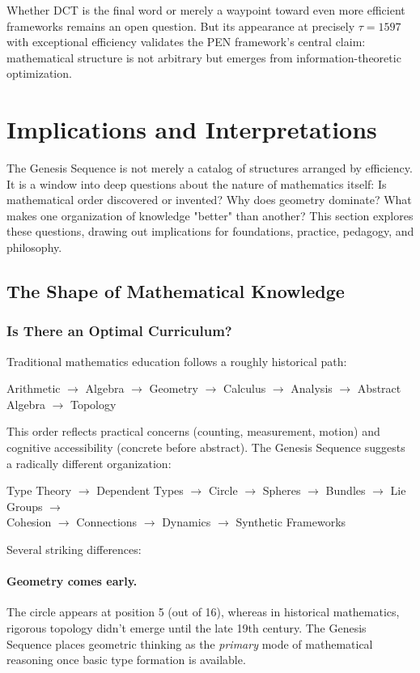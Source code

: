 \documentclass[11pt]{article}
\theoremstyle{definition}
\begin{document}
Whether DCT is the final word or merely a waypoint toward even more efficient frameworks remains an open question. But its appearance at precisely $\tau=1597$ with exceptional efficiency validates the PEN framework's central claim: mathematical structure is not arbitrary but emerges from information-theoretic optimization.

\section{Implications and Interpretations}
\label{sec:implications}

The Genesis Sequence is not merely a catalog of structures arranged by efficiency. It is a window into deep questions about the nature of mathematics itself: Is mathematical order discovered or invented? Why does geometry dominate? What makes one organization of knowledge "better" than another? This section explores these questions, drawing out implications for foundations, practice, pedagogy, and philosophy.

\subsection{The Shape of Mathematical Knowledge}

\subsubsection{Is There an Optimal Curriculum?}

Traditional mathematics education follows a roughly historical path:
\begin{center}
Arithmetic $\to$ Algebra $\to$ Geometry $\to$ Calculus $\to$ Analysis $\to$ Abstract Algebra $\to$ Topology
\end{center}

This order reflects practical concerns (counting, measurement, motion) and cognitive accessibility (concrete before abstract). The Genesis Sequence suggests a radically different organization:

\begin{center}
Type Theory $\to$ Dependent Types $\to$ Circle $\to$ Spheres $\to$ Bundles $\to$ Lie Groups $\to$ \\ 
Cohesion $\to$ Connections $\to$ Dynamics $\to$ Synthetic Frameworks
\end{center}

Several striking differences:

\paragraph{Geometry comes early.}
The circle appears at position 5 (out of 16), whereas in historical mathematics, rigorous topology didn't emerge until the late 19th century. The Genesis Sequence places geometric thinking as the \emph{primary} mode of mathematical reasoning once basic type formation is available.
\end{document}
